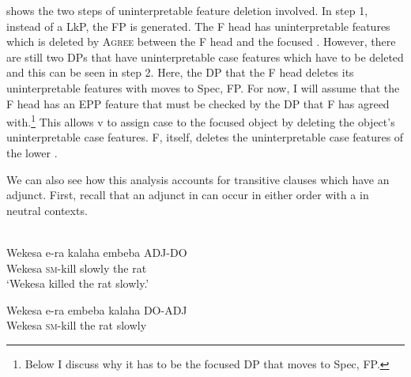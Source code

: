 \documentclass[output=paper
,newtxmath
,modfonts
,nonflat]{langsci/langscibook}
\begin{document}
 shows the two steps of uninterpretable feature deletion involved. In step 1, instead of a LkP, the FP is generated. The F head has uninterpretable  features which is deleted by \textsc{Agree} between the F head and the focused . However, there are still two DPs that have uninterpretable case features which have to be deleted and this can be seen in step 2. Here, the DP that the F head deletes its uninterpretable  features with moves to Spec, FP. For now, I will assume that the F head has an EPP feature that must be checked by the DP that F has agreed with.\footnote{Below I discuss why it has to be the focused DP that moves to Spec, FP.} This allows v to assign case to the focused object by deleting the object’s uninterpretable case features. F, itself, deletes the uninterpretable case features of the lower . 

We can also see how this analysis accounts for transitive clauses which have an adjunct. First, recall that an adjunct in  can occur in either order with a  in neutral contexts.

\ea\label{ex:selvanathan:13}
\\
\ea\label{ex:selvanathan:13a}
\gll Wekesa  e-ra     kalaha   embeba  ADJ-DO \\
Wekesa   \textsc{sm}{}-kill   slowly    {the rat} \\
\glt `Wekesa killed the rat slowly.'

\ex\label{ex:selvanathan:13b}
\gll Wekesa  e-ra     embeba  kalaha   DO-ADJ \\
Wekesa   \textsc{sm}{}-kill   {the rat}    slowly \\
\z
\z
  
\end{document}
